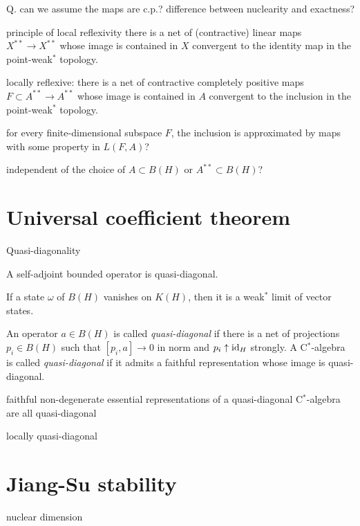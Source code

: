 \documentclass{../../large}
\begin{document}
Q. can we assume the maps are c.p.? difference between nuclearity and exactness?

principle of local reflexivity
there is a net of (contractive) linear maps $X^{**}\to X^{**}$ whose image is contained in $X$ convergent to the identity map in the point-weak$^*$ topology.

locally reflexive:
there is a net of contractive completely positive maps $F\subset A^{**}\to A^{**}$ whose image is contained in $A$ convergent to the inclusion in the point-weak$^*$ topology.

for every finite-dimensional subspace $F$, the inclusion is approximated by maps with some property in $L(F,A)$?

independent of the choice of $A\subset B(H)$ or $A^{**}\subset B(H)$?




\section{Universal coefficient theorem}

Quasi-diagonality

\begin{prb}
A self-adjoint bounded operator is quasi-diagonal.
\end{prb}

\begin{prb}
If a state $\omega$ of $B(H)$ vanishes on $K(H)$, then it is a weak$^*$ limit of vector states.
\end{prb}

\begin{prb}
\end{prb}


\begin{prb}
An operator $a\in B(H)$ is called \emph{quasi-diagonal} if there is a net of projections $p_i\in B(H)$ such that $[p_i,a]\to0$ in norm and $p_i\uparrow\operatorname{id}_H$ strongly.
A C$^*$-algebra is called \emph{quasi-diagonal} if it admits a faithful representation whose image is quasi-diagonal.
\end{prb}

faithful non-degenerate essential representations of a quasi-diagonal C$^*$-algebra are all quasi-diagonal

locally quasi-diagonal





\section{Jiang-Su stability}
nuclear dimension
\end{document}
